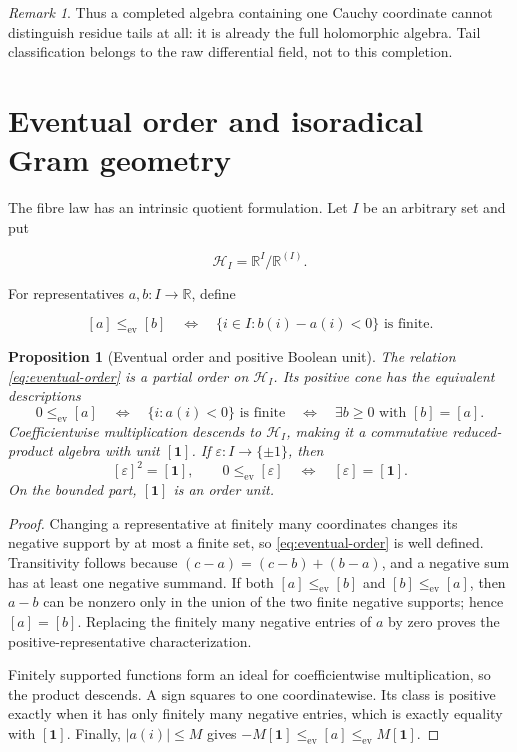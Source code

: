 \documentclass[11pt]{article}
\newtheorem{proposition}[theorem]{Proposition}
\theoremstyle{definition}
\theoremstyle{remark}
\newtheorem{remark}[theorem]{Remark}
\newcommand{\R}{\mathbb R}
\begin{document}
\begin{remark}
Thus a completed algebra containing one Cauchy coordinate cannot distinguish residue tails at
all: it is already the full holomorphic algebra.  Tail classification belongs to the raw
differential field, not to this completion.
\end{remark}

\section{Eventual order and isoradical Gram geometry}
\label{sec:gram}

The fibre law has an intrinsic quotient formulation.  Let \(I\) be an arbitrary set and put

\[
  \mathcal H_I=\R^I/\R^{(I)}.
\]

For representatives \(a,b:I\to\R\), define

\begin{equation}\label{eq:eventual-order}
  [a]\leq_{\mathrm{ev}}[b]
  \quad\Longleftrightarrow\quad
  \{i\in I:b(i)-a(i)<0\}\text{ is finite}.
\end{equation}

\begin{proposition}[Eventual order and positive Boolean unit]
\label{prop:eventual-order}
The relation \eqref{eq:eventual-order} is a partial order on \(\mathcal H_I\).  Its positive
cone has the equivalent descriptions
\[
  0\leq_{\mathrm{ev}}[a]
  \quad\Longleftrightarrow\quad
  \{i:a(i)<0\}\text{ is finite}
  \quad\Longleftrightarrow\quad
  \exists b\geq0\text{ with }[b]=[a].
\]
Coefficientwise multiplication descends to \(\mathcal H_I\), making it a commutative
reduced-product algebra with unit \([\mathbf 1]\).  If
\(\varepsilon:I\to\{\pm1\}\), then
\[
  [\varepsilon]^2=[\mathbf1],
  \qquad
  0\leq_{\mathrm{ev}}[\varepsilon]
  \quad\Longleftrightarrow\quad
  [\varepsilon]=[\mathbf1].
\]
On the bounded part, \([\mathbf1]\) is an order unit.
\end{proposition}

\begin{proof}
Changing a representative at finitely many coordinates changes its negative support by at most
a finite set, so \eqref{eq:eventual-order} is well defined.  Transitivity follows because
\((c-a)=(c-b)+(b-a)\), and a negative sum has at least one negative summand.  If both
\([a]\leq_{\mathrm{ev}}[b]\) and \([b]\leq_{\mathrm{ev}}[a]\), then
\(a-b\) can be nonzero only in the union of the two finite negative supports; hence
\([a]=[b]\).  Replacing the finitely many negative entries of \(a\) by zero proves the
positive-representative characterization.

Finitely supported functions form an ideal for coefficientwise multiplication, so the product
descends.  A sign squares to one coordinatewise.  Its class is positive exactly when it has only
finitely many negative entries, which is exactly equality with \([\mathbf1]\).  Finally,
\(|a(i)|\leq M\) gives
\(-M[\mathbf1]\leq_{\mathrm{ev}}[a]\leq_{\mathrm{ev}}M[\mathbf1]\).
\end{proof}
\end{document}
